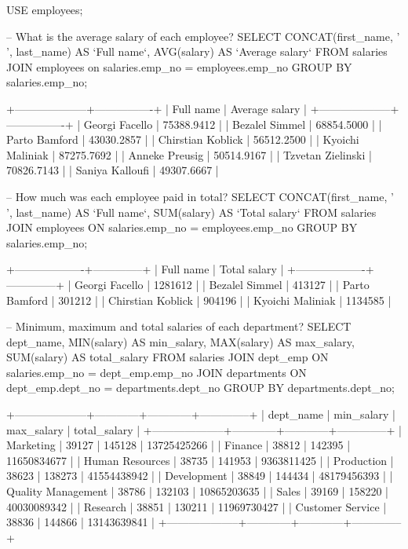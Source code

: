 USE employees;

-- What is the average salary of each employee?
SELECT 
    CONCAT(first_name, ' ', last_name) AS `Full name`,
    AVG(salary) AS `Average salary`
FROM
    salaries
        JOIN
    employees on salaries.emp_no = employees.emp_no
GROUP BY salaries.emp_no;

+--------------------+----------------+
| Full name          | Average salary |
+--------------------+----------------+
| Georgi Facello     |     75388.9412 |
| Bezalel Simmel     |     68854.5000 |
| Parto Bamford      |     43030.2857 |
| Chirstian Koblick  |     56512.2500 |
| Kyoichi Maliniak   |     87275.7692 |
| Anneke Preusig     |     50514.9167 |
| Tzvetan Zielinski  |     70826.7143 |
| Saniya Kalloufi    |     49307.6667 |

-- How much was each employee paid in total?
SELECT 
    CONCAT(first_name, ' ', last_name) AS `Full name`,
    SUM(salary) AS `Total salary`
FROM
    salaries
        JOIN
    employees ON salaries.emp_no = employees.emp_no
GROUP BY salaries.emp_no;

+-------------------+--------------+
| Full name         | Total salary |
+-------------------+--------------+
| Georgi Facello    |      1281612 |
| Bezalel Simmel    |       413127 |
| Parto Bamford     |       301212 |
| Chirstian Koblick |       904196 |
| Kyoichi Maliniak  |      1134585 |

-- Minimum, maximum and total salaries of each department?
SELECT 
    dept_name,
    MIN(salary) AS min_salary,
    MAX(salary) AS max_salary,
    SUM(salary) AS total_salary
FROM
    salaries
        JOIN
    dept_emp ON salaries.emp_no = dept_emp.emp_no
        JOIN
    departments ON dept_emp.dept_no = departments.dept_no
GROUP BY departments.dept_no;

+--------------------+------------+------------+--------------+
| dept_name          | min_salary | max_salary | total_salary |
+--------------------+------------+------------+--------------+
| Marketing          |      39127 |     145128 |  13725425266 |
| Finance            |      38812 |     142395 |  11650834677 |
| Human Resources    |      38735 |     141953 |   9363811425 |
| Production         |      38623 |     138273 |  41554438942 |
| Development        |      38849 |     144434 |  48179456393 |
| Quality Management |      38786 |     132103 |  10865203635 |
| Sales              |      39169 |     158220 |  40030089342 |
| Research           |      38851 |     130211 |  11969730427 |
| Customer Service   |      38836 |     144866 |  13143639841 |
+--------------------+------------+------------+--------------+

